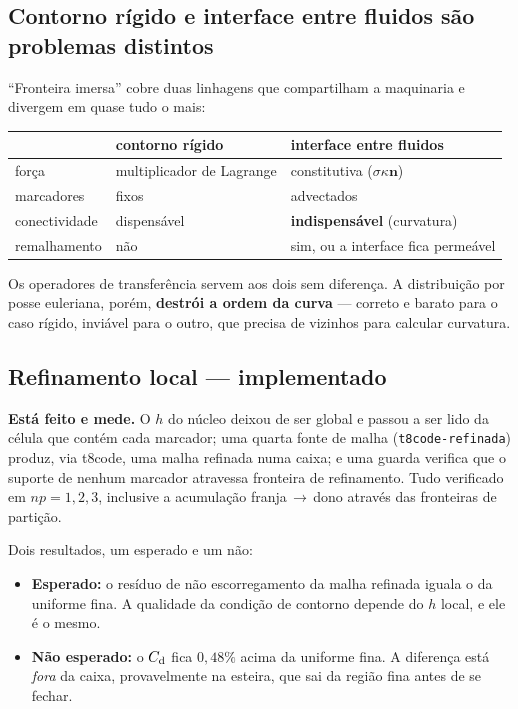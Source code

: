 \subsection{Contorno rígido e interface entre fluidos são problemas distintos}

``Fronteira imersa'' cobre duas linhagens que compartilham a maquinaria e
divergem em quase tudo o mais:

\begin{center}
\begin{tabular}{lll}
  \toprule
   & \textbf{contorno rígido} & \textbf{interface entre fluidos} \\
  \midrule
  força        & multiplicador de Lagrange & constitutiva ($\sigma\kappa\mathbf{n}$) \\
  marcadores   & fixos                     & advectados \\
  conectividade& dispensável               & \textbf{indispensável} (curvatura) \\
  remalhamento & não                       & sim, ou a interface fica permeável \\
  \bottomrule
\end{tabular}
\end{center}

Os operadores de transferência servem aos dois sem diferença. A distribuição por
posse euleriana, porém, \textbf{destrói a ordem da curva} --- correto e barato
para o caso rígido, inviável para o outro, que precisa de vizinhos para calcular
curvatura.

\subsection{Refinamento local --- implementado}

\textbf{Está feito e mede.} O $h$ do núcleo deixou de ser global e passou a ser
lido da célula que contém cada marcador; uma quarta fonte de malha
(\texttt{t8code-refinada}) produz, via t8code, uma malha refinada numa caixa; e
uma guarda verifica que o suporte de nenhum marcador atravessa fronteira de
refinamento. Tudo verificado em $np=1,2,3$, inclusive a acumulação
franja\,$\to$\,dono através das fronteiras de partição.

Dois resultados, um esperado e um não:

\begin{itemize}
  \item \textbf{Esperado:} o resíduo de não escorregamento da malha refinada
        iguala o da uniforme fina. A qualidade da condição de contorno depende do
        $h$ local, e ele é o mesmo.
  \item \textbf{Não esperado:} o $C_{\mathrm{d}}$ fica $0{,}48\%$ acima da uniforme fina.
        A diferença está \emph{fora} da caixa, provavelmente na esteira, que sai
        da região fina antes de se fechar.
\end{itemize}


